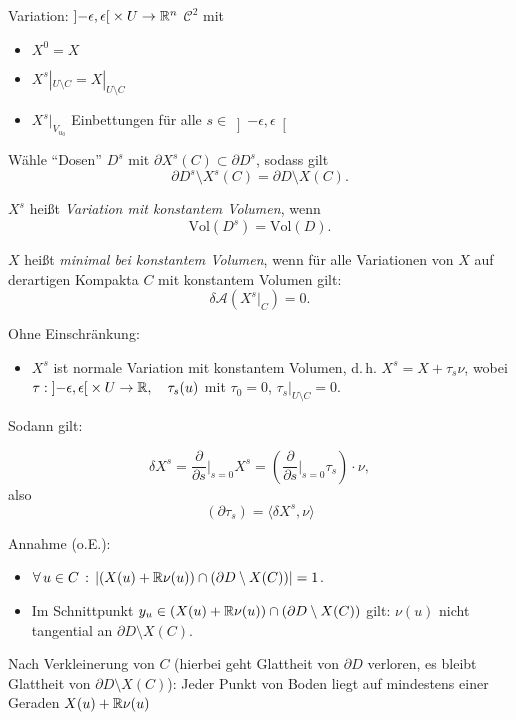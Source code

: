 \documentclass{cheat-sheet}
\begin{document}
Variation: $\left] -\epsilon, \epsilon \right[ \times U \to \mathbb{R}^n$ $\mathcal{C}^2$ mit

\begin{itemize}
  \item $X^0 = X$
  \item $X^s|_{U \setminus C} = X|_{U \setminus C}$
  \item $X^s|_{V_{u_0}}$ Einbettungen für alle $s \in \left] -\epsilon, \epsilon \right[$
\end{itemize}

Wähle "`Dosen"' $D^s$ mit $\partial X^s(C) \subset \partial D^s$, sodass gilt
\[ \partial D^s \setminus X^s(C) = \partial D \setminus X(C). \]

$X^s$ heißt \emph{Variation mit konstantem Volumen}, wenn
\[ \mathrm{Vol}(D^s) = \mathrm{Vol}(D). \]

\begin{defn}
  $X$ heißt \emph{minimal bei konstantem Volumen}, wenn für alle Variationen von $X$ auf derartigen Kompakta $C$ mit konstantem Volumen gilt:
  \[ \delta \mathcal{A} (X^s|_C) = 0. \]
\end{defn}

Ohne Einschränkung:
\begin{itemize}
  \item $X^s$ ist normale Variation mit konstantem Volumen, %
  d.\,h. $X^s = X + \tau_s \nu$, wobei $\tau : \left] -\epsilon, \epsilon \right[ \times U \to \mathbb{R}, \quad \tau_s(u)$ mit $\tau_0 = 0$, $\tau_s|_{U \setminus C} = 0$.
\end{itemize}

Sodann gilt:

\[ \delta X^s = \frac{\partial}{\partial s}|_{s=0} X^s = (\frac{\partial}{\partial s}|_{s=0} \tau_s) \cdot \nu, \]
also
\[ (\partial \tau_s) = \langle \delta X^s, \nu \rangle \] %

Annahme (o.E.):
\begin{itemize}
  \item $\forall \, {u \in C} \,:\, \lvert(X(u) + \mathbb{R} \nu(u)) \cap (\partial D \setminus X(C))\rvert = 1$.
  \item Im Schnittpunkt $y_u \in (X(u) + \mathbb{R} \nu(u)) \cap (\partial D \setminus X(C))$ gilt: $\nu(u)$ nicht tangential an $\partial D \setminus X(C)$.
\end{itemize}

Nach Verkleinerung von $C$ (hierbei geht Glattheit von $\partial D$ verloren, es bleibt Glattheit von $\partial D \setminus X(C)$):
Jeder Punkt von Boden liegt auf mindestens einer Geraden $X(u) + \mathbb{R} \nu(u)$
\end{document}
